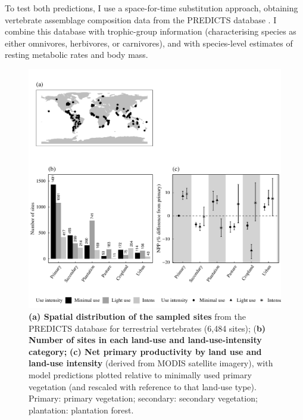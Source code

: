 To test both predictions, I use a space-for-time substitution approach, obtaining vertebrate assemblage composition data from the PREDICTS database \citep{Hudson2014, Hudson2017}. I combine this database with trophic-group information (characterising species as either omnivores, herbivores, or carnivores), and with species-level estimates of resting metabolic rates and body mass. 
  
\begin{figure}[h!]
\centering
\includegraphics[scale=0.75]{figures/Chapter5/Figure1}
\caption[Map of PREDICTS sites, sample sizes and NPP by land use and land-use intensity]{\textbf{(a) Spatial distribution of the sampled sites} from the PREDICTS database for terrestrial vertebrates (6,484 sites); (\textbf{b) Number of sites in each land-use and land-use-intensity category;} \textbf{(c) Net primary productivity by land use and land-use intensity} (derived from MODIS satellite imagery), with model predictions plotted relative to minimally used primary vegetation (and rescaled with reference to that land-use type). Primary: primary vegetation; secondary: secondary vegetation; plantation: plantation forest.}
\label{chap5_fig1}
\end{figure}

\clearpage

